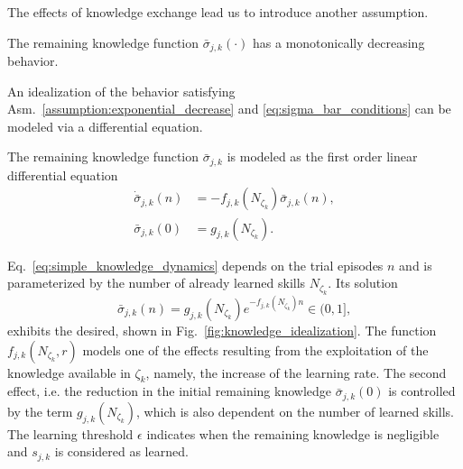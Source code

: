 The effects of knowledge exchange lead us to introduce another assumption.
\begin{tcolorbox}
	\begin{assumption}\label{assumption:exponential_decrease} The remaining knowledge function $\bar{\sigma}_{j,k}(\cdot)$ has a monotonically decreasing behavior.
	\end{assumption}
\end{tcolorbox} 
\noindent

An idealization of the behavior satisfying Asm.~\ref{assumption:exponential_decrease} and \eqref{eq:sigma_bar_conditions} can be modeled via a differential equation.
\begin{tcolorbox}
	\begin{definition}\label{assumption:ode_model}
		The remaining knowledge function $\bar{\sigma}_{j,k}$ is modeled as the first order linear differential equation
		\begin{subequations}\label{eq:simple_knowledge_dynamics}
			\begin{alignat}{2}
				\dot{\bar{\sigma}}_{j,k}\left(n\right) &= -f_{j,k} \left(N_{\zeta_k} \right) \bar{\sigma}_{j,k}\left(n\right),\\
				\bar{\sigma}_{j,k}(0) &= g_{j,k} \left(N_{\zeta_k}\right).
			\end{alignat}
		\end{subequations}
	\end{definition}
\end{tcolorbox} 
Eq.~\eqref{eq:simple_knowledge_dynamics} depends on the trial episodes $n$ and is parameterized by the number of already learned skills $N_{\zeta_k}$. Its solution
\begin{equation}\label{eq:knowledge_exponential_form}
	\boxed{\bar{\sigma}_{j,k}(n) = g_{j,k}\left(N_{\zeta_k}\right) e ^{-f_{j,k}\left(N_{\zeta_k}\right) n} \in (0,1]},
\end{equation}
exhibits the desired, shown in Fig.~\ref{fig:knowledge_idealization}. The function $f_{j,k}\left(N_{\zeta_k}, r\right)$ models one of the effects resulting from the exploitation of the knowledge available in $\zeta_k$, namely, the increase of the learning rate. The second effect, i.e. the reduction in the initial remaining knowledge $\bar{\sigma}_{j,k}(0)$ is controlled by the term $g_{j,k}\left(N_{\zeta_k}\right)$, which is also dependent on the number of learned skills. The learning threshold $\epsilon$ indicates when the remaining knowledge is negligible and $s_{j,k}$ is considered as learned.
